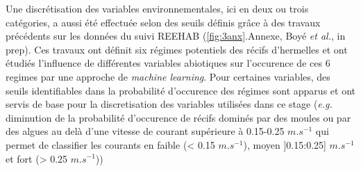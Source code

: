 \documentclass[12pt]{report}
\begin{document}
Une discrétisation des variables environnementales, ici en deux ou trois catégories, a aussi été effectuée selon des seuils définis grâce à des travaux précédents sur les données du suivi REEHAB (\autoref{fig:3anx}.Annexe, Boyé \textit{et al.}, in prep). Ces travaux ont définit six régimes potentiels des récifs d’hermelles et ont étudiés l’influence de différentes variables abiotiques sur l’occurence de ces 6 regimes par une approche de \textit{machine learning}. Pour certaines variables, des seuils identifiables dans la probabilité d’occurence des régimes sont apparus et ont servis de base pour la discretisation des variables utilisées dans ce stage (\textit{e.g.} diminution de la probabilité d’occurence de récifs dominés par des moules ou par des algues au delà d’une vitesse de courant supérieure à 0.15-0.25 $m.s^{-1}$ qui permet de classifier les courants en faible (< 0.15 $m.s^{-1}$), moyen ]0.15:0.25] $m.s^{-1}$ et fort (> 0.25 $m.s^{-1}$))


\newline \newline
\end{document}
